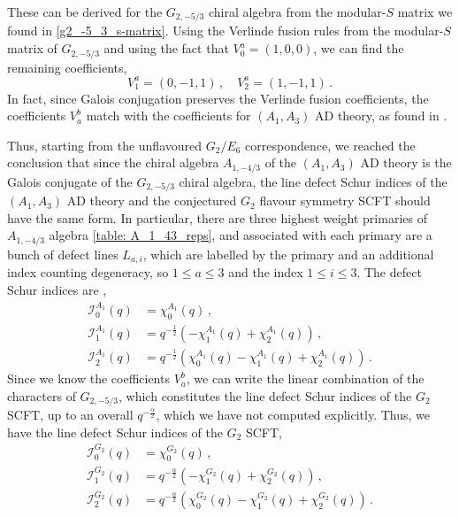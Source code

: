 \documentclass[a4paper,12pt]{article}
\begin{document}
These can be derived for the $G_{2,-5/3}$ chiral algebra from the modular-$S$ matrix we found in \eqref{g2_-5_3_s-matrix}. 
Using the Verlinde fusion rules from the modular-$S$ matrix of $G_{2,-5/3}$ and using the fact that $V_{0}^{a}=(1,0,0)$, we can find the remaining coefficients,
\begin{equation}
 V_1^a=(0,-1,1)\, ,\quad V_2^a=(1,-1,1)\, .
\end{equation}
In fact, since Galois conjugation preserves the Verlinde fusion coefficients, the coefficients $V_a^b$ match with the coefficients for $(A_1,A_3)$ AD theory, as found in \cite{Cordova:2016uwk}. 


Thus, starting from the unflavoured $G_2/E_6$ correspondence, we reached the conclusion that since the chiral algebra $A_{1,-4/3}$ of the $(A_1,A_3)$ AD theory is the Galois conjugate of the $G_{2,-5/3}$ chiral algebra, the line defect Schur indices of the $(A_1,A_3)$ AD theory and the conjectured $G_2$ flavour symmetry SCFT should have the same form. In particular, there are three highest weight primaries of $A_{1,-4/3}$ algebra \ref{table: A_1_43_reps}, and associated with each primary are a bunch of defect lines $L_{a,i}$, which are labelled by the primary and an additional index counting degeneracy, so $1\leq a\leq 3$ and the index $1\leq i\leq 3$. The defect Schur indices are \cite{Cordova:2016uwk},
\begin{align}
    \mathcal{I}_{0}^{A_1}(q)&=\chi_0^{A_1}(q)\, ,\nonumber\\
    \mathcal{I}_{1}^{A_1}(q)&=q^{-\frac{1}{2}}\left(-\chi_1^{A_1}(q)+\chi_2^{A_1}(q)\right)\, ,\nonumber\\
    \mathcal{I}_{2}^{A_1}(q)&=q^{-\frac{1}{2}}\left(\chi_0^{A_1}(q)-\chi_1^{A_1}(q)+\chi_2^{A_1}(q)\right)\, .
\end{align}
Since we know the coefficients $V_a^b$, we can write the linear combination of the characters of $G_{2,-5/3}$, which constitutes the line defect Schur indices of the $G_2$ SCFT, up to an overall $q^{-\frac{\alpha}{2}}$, which we have not computed explicitly. Thus, we have the line defect Schur indices of the $G_2$ SCFT,
\begin{align}
    \mathcal{I}_{0}^{G_2}(q)&=\chi_0^{G_2}(q)\, ,\nonumber\\
    \mathcal{I}_{1}^{G_2}(q)&=q^{-\frac{\alpha}{2}}\left(-\chi_1^{G_2}(q)+\chi_2^{G_2}(q)\right)\, ,\nonumber\\
    \mathcal{I}_{2}^{G_2}(q)&=q^{-\frac{\alpha}{2}}\left(\chi_0^{G_2}(q)-\chi_1^{G_2}(q)+\chi_2^{G_2}(q)\right)\, .
\end{align}
\end{document}
